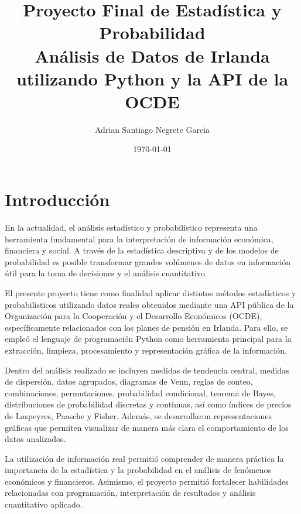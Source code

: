 \documentclass[12pt]{article}
\title{Proyecto Final de Estadística y Probabilidad\\
Análisis de Datos de Irlanda utilizando Python y la API de la OCDE}
\author{Adrian Santiago Negrete Garcia}
\date{\today}
\begin{document}
\maketitle

\tableofcontents
\newpage


\section{Introducción}


En la actualidad, el análisis estadístico y probabilístico representa una herramienta fundamental para la interpretación de información económica, financiera y social. A través de la estadística descriptiva y de los modelos de probabilidad es posible transformar grandes volúmenes de datos en información útil para la toma de decisiones y el análisis cuantitativo.

El presente proyecto tiene como finalidad aplicar distintos métodos estadísticos y probabilísticos utilizando datos reales obtenidos mediante una API pública de la Organización para la Cooperación y el Desarrollo Económicos (OCDE), específicamente relacionados con los planes de pensión en Irlanda. Para ello, se empleó el lenguaje de programación Python como herramienta principal para la extracción, limpieza, procesamiento y representación gráfica de la información.

Dentro del análisis realizado se incluyen medidas de tendencia central, medidas de dispersión, datos agrupados, diagramas de Venn, reglas de conteo, combinaciones, permutaciones, probabilidad condicional, teorema de Bayes, distribuciones de probabilidad discretas y continuas, así como índices de precios de Laspeyres, Paasche y Fisher. Además, se desarrollaron representaciones gráficas que permiten visualizar de manera más clara el comportamiento de los datos analizados.

La utilización de información real permitió comprender de manera práctica la importancia de la estadística y la probabilidad en el análisis de fenómenos económicos y financieros. Asimismo, el proyecto permitió fortalecer habilidades relacionadas con programación, interpretación de resultados y análisis cuantitativo aplicado.

\end{document}
